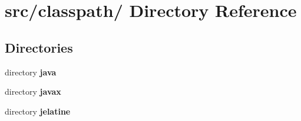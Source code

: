 \section{src/classpath/ Directory Reference}
\label{dir_7028635adae93f6f6118e89d399fedb4}
\subsection*{Directories}
\begin{DoxyCompactItemize}
\item 
directory {\bf java}
\item 
directory {\bf javax}
\item 
directory {\bf jelatine}
\end{DoxyCompactItemize}
